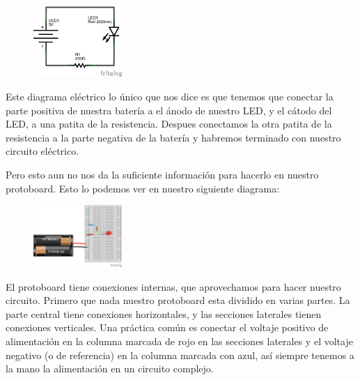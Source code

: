\documentclass[paper=letter, fontsize=11pt]{scrartcl} %
\numberwithin{equation}{section} %
\numberwithin{figure}{section} %
\numberwithin{table}{section} %
\begin{document}
    \begin{figure}[h]
    	\begin{center}
    		\includegraphics[width=0.3\textwidth]{LED-bateria-diagrama.png} %
    	\end{center}
    \end{figure}

    Este diagrama eléctrico lo único que nos dice es que tenemos que conectar la parte positiva de nuestra batería a el ánodo de nuestro LED, y el cátodo del LED, a una patita de la resistencia. Despues conectamos la otra patita de la resistencia a la parte negativa de la batería y habremos terminado con nuestro circuito eléctrico.

    Pero esto aun no nos da la suficiente información para hacerlo en nuestro protoboard. Esto lo podemos ver en nuestro siguiente diagrama:

    \begin{figure}[h]
    	\begin{center}
    		\includegraphics[width=0.3\textwidth]{LED-bateria.png} %
    	\end{center}
    \end{figure}

    El protoboard tiene conexiones internas, que aprovechamos para hacer nuestro circuito. Primero que nada nuestro protoboard esta dividido en varias partes. La parte central tiene conexiones horizontales, y las secciones laterales tienen conexiones verticales. Una práctica común es conectar el voltaje positivo de alimentación en la columna marcada de rojo en las secciones laterales y el voltaje negativo (o de referencia) en la columna marcada con azul, así siempre tenemos a la mano la alimentación en un circuito complejo.
\end{document}

